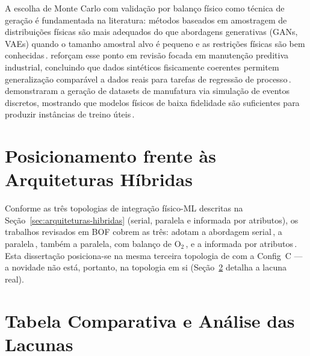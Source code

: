 A escolha de Monte Carlo com validação por balanço físico como técnica de geração é fundamentada na literatura: métodos baseados em amostragem de distribuições físicas são mais adequados do que abordagens generativas (GANs, VAEs) quando o tamanho amostral alvo é pequeno e as restrições físicas são bem conhecidas\,\cite{buggineni2024synthetic,morales2025synthetic}. \citeauthor{morales2025synthetic} reforçam esse ponto em revisão focada em manutenção preditiva industrial, concluindo que dados sintéticos fisicamente coerentes permitem generalização comparável a dados reais para tarefas de regressão de processo\,\cite{morales2025synthetic}. \citeauthor{giannini2022synthetic} demonstraram a geração de datasets de manufatura via simulação de eventos discretos, mostrando que modelos físicos de baixa fidelidade são suficientes para produzir instâncias de treino úteis\,\cite{giannini2022synthetic}.

\section{Posicionamento frente às Arquiteturas Híbridas}
\label{sec:hibridas}

Conforme as três topologias de integração físico-ML descritas na Seção~\ref{sec:arquiteturas-hibridas} (serial, paralela e informada por atributos), os trabalhos revisados em BOF cobrem as três: \citeauthor{chattopadhyay2022hybrid} adotam a abordagem serial\,\cite{chattopadhyay2022hybrid}, \citeauthor{xia2024dmpinn} a paralela\,\cite{xia2024dmpinn}, \citeauthor{shao2024hybrid} também a paralela, com balanço de O$_2$\,\cite{shao2024hybrid}, e \citeauthor{bae2020bof} a informada por atributos\,\cite{bae2020bof}. Esta dissertação posiciona-se na mesma terceira topologia de \citeauthor{bae2020bof} com a Config~C — a novidade não está, portanto, na topologia em si (Seção~\ref{sec:analise-lacunas} detalha a lacuna real).

\section{Tabela Comparativa e Análise das Lacunas}
\label{sec:analise-lacunas}


